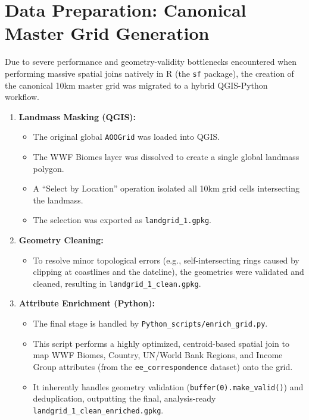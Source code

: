 \documentclass[
  letterpaper,
  DIV=11,
  numbers=noendperiod]{scrreprt}
\providecommand{\tightlist}{%
  \setlength{\itemsep}{0pt}\setlength{\parskip}{0pt}}
\begin{document}
\section{Data Preparation: Canonical Master Grid
Generation}\label{data-preparation-canonical-master-grid-generation}

Due to severe performance and geometry-validity bottlenecks encountered
when performing massive spatial joins natively in R (the \texttt{sf}
package), the creation of the canonical 10km master grid was migrated to
a hybrid QGIS-Python workflow.

\begin{enumerate}
\def\labelenumi{\arabic{enumi}.}
\tightlist
\item
  \textbf{Landmass Masking (QGIS):}

  \begin{itemize}
  \tightlist
  \item
    The original global \texttt{AOOGrid} was loaded into QGIS.
  \item
    The WWF Biomes layer was dissolved to create a single global
    landmass polygon.
  \item
    A ``Select by Location'' operation isolated all 10km grid cells
    intersecting the landmass.
  \item
    The selection was exported as \texttt{landgrid\_1.gpkg}.
  \end{itemize}
\item
  \textbf{Geometry Cleaning:}

  \begin{itemize}
  \tightlist
  \item
    To resolve minor topological errors (e.g., self-intersecting rings
    caused by clipping at coastlines and the dateline), the geometries
    were validated and cleaned, resulting in
    \texttt{landgrid\_1\_clean.gpkg}.
  \end{itemize}
\item
  \textbf{Attribute Enrichment (Python):}

  \begin{itemize}
  \tightlist
  \item
    The final stage is handled by
    \texttt{Python\_scripts/enrich\_grid.py}.
  \item
    This script performs a highly optimized, centroid-based spatial join
    to map WWF Biomes, Country, UN/World Bank Regions, and Income Group
    attributes (from the \texttt{ee\_correspondence} dataset) onto the
    grid.
  \item
    It inherently handles geometry validation
    (\texttt{buffer(0).make\_valid()}) and deduplication, outputting the
    final, analysis-ready \texttt{landgrid\_1\_clean\_enriched.gpkg}.
  \end{itemize}
\end{enumerate}
\end{document}
